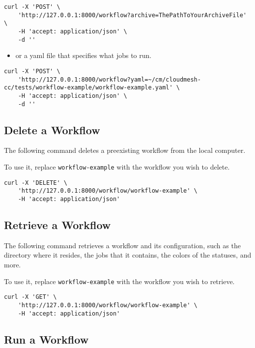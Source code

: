 \begin{verbatim}
curl -X 'POST' \
    'http://127.0.0.1:8000/workflow?archive=ThePathToYourArchiveFile' \
    -H 'accept: application/json' \
    -d ''
\end{verbatim}

\begin{itemize}
\item
  or a yaml file that specifies what jobs to run.
\end{itemize}

\begin{verbatim}
curl -X 'POST' \
    'http://127.0.0.1:8000/workflow?yaml=~/cm/cloudmesh-cc/tests/workflow-example/workflow-example.yaml' \
    -H 'accept: application/json' \
    -d ''
\end{verbatim}

\subsection{Delete a Workflow}\label{delete-a-workflow}

The following command deletes a preexisting workflow from the local
computer.

To use it, replace \texttt{workflow-example} with the workflow you wish
to delete.

\begin{verbatim}
curl -X 'DELETE' \
    'http://127.0.0.1:8000/workflow/workflow-example' \
    -H 'accept: application/json'
\end{verbatim}

\subsection{Retrieve a Workflow}\label{retrieve-a-workflow}

The following command retrieves a workflow and its configuration, such
as the directory where it resides, the jobs that it contains, the colors
of the statuses, and more.

To use it, replace \texttt{workflow-example} with the workflow you wish
to retrieve.

\begin{verbatim}
curl -X 'GET' \
    'http://127.0.0.1:8000/workflow/workflow-example' \
    -H 'accept: application/json'
\end{verbatim}

\subsection{Run a Workflow}\label{run-a-workflow}

